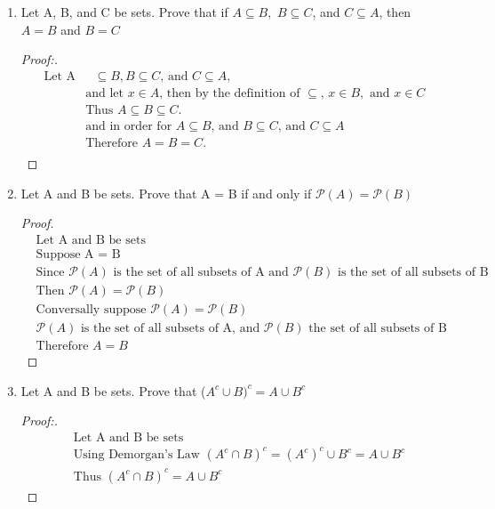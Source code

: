 \documentclass[11pt]{article}
\begin{document}
\begin{enumerate}
    \item Let A, B, and C be sets. Prove that if $A \subseteq B,$ $B \subseteq C$, and $C \subseteq A$, then $A = B$ and $B = C$
       \begin{proof}[Proof:\nopunct]
            \begin{align*}
                \text{Let A} & \text{ $\subseteq B, B \subseteq C$, and $C \subseteq A$,} \\
                & \text{and let $x\in  A$, then by the definition of $\subseteq$, $x\in B,$ and $x\in C$} \\
                & \text{Thus $A\subseteq B \subseteq C$.} \\
                & \text{and in order for $A \subseteq B$, and $B \subseteq C$, and $C\subseteq A$} \\
                & \text{Therefore $A=B=C.$} \\
            \end{align*}
        \end{proof}
        
    \item Let A and B be sets. Prove that A = B if and only if $\mathscr{P}(A) = \mathscr{P}(B)$
        \begin{proof}
            \begin{align*}
                & \text{Let A and B be sets} \\
                & \text{Suppose A = B} \\
                & \text{Since $\mathscr{P}(A)$ is the set of all subsets of A and $\mathscr{P}(B)$ is the set of all subsets of B} \\
                & \text{Then $\mathscr{P}(A)=\mathscr{P}(B)$} \\
                & \text{Conversally suppose $\mathscr{P}(A) = \mathscr{P}(B)$} \\
                & \text{$\mathscr{P}(A)$ is the set of all subsets of A, and $\mathscr{P}(B)$ the set of all subsets of B} \\
                & \text{Therefore $A = B$}
            \end{align*}
        \end{proof}
        
    \item Let A and B be sets. Prove that ($A^c \cup B)^c = A \cup B^c$
        \begin{proof}[Proof:\nopunct]
            \begin{align*}
                & \text{Let A and B be sets} \\
                & \text{Using Demorgan's Law $(A^c \cap B)^c =  (A^c)^c \cup B^c = A \cup B^c$} \\
                & \text{Thus $(A^c \cap B)^c = A \cup B^c$}
            \end{align*}
        \end{proof}
        

\end{enumerate}
\end{document}
